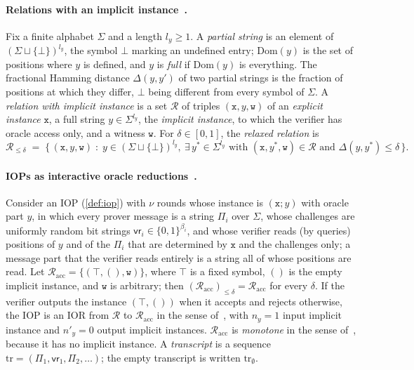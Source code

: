 \paragraph{Relations with an implicit instance~\cite[\S3.3]{CDHZ25}.}
Fix a finite alphabet $\Sigma$ and a length $l_y \ge 1$.
A \emph{partial string} is an element of $(\Sigma \sqcup \{\bot\})^{l_y}$, the symbol $\bot$ marking an undefined entry; $\mathrm{Dom}(y)$ is the set of positions where $y$ is defined, and $y$ is \emph{full} if $\mathrm{Dom}(y)$ is everything.
The fractional Hamming distance $\Delta(y,y')$ of two partial strings is the fraction of positions at which they differ, $\bot$ being different from every symbol of $\Sigma$.
A \emph{relation with implicit instance} is a set $\mathcal{R}$ of triples $(\mathtt{x}, y, \mathtt{w})$ of an \emph{explicit instance} $\mathtt{x}$, a full string $y \in \Sigma^{l_y}$, the \emph{implicit instance}, to which the verifier has oracle access only, and a witness $\mathtt{w}$.
For $\delta \in [0,1]$, the \emph{relaxed relation} is
\[
  \mathcal{R}_{\le\delta} \;=\; \bigl\{\, (\mathtt{x}, y, \mathtt{w}) \;:\; y \in (\Sigma \sqcup \{\bot\})^{l_y},\ \exists\, y^* \in \Sigma^{l_y} \text{ with } (\mathtt{x}, y^*, \mathtt{w}) \in \mathcal{R} \text{ and } \Delta(y, y^*) \le \delta \,\bigr\}.
\]

\paragraph{IOPs as interactive oracle reductions~\cite[\S3.4]{CDHZ25}.}
Consider an IOP (\cref{def:iop}) with $\nu$ rounds whose instance is $(\mathtt{x}; y)$ with oracle part $y$, in which every prover message is a string $\Pi_i$ over $\Sigma$, whose challenges are uniformly random bit strings $\mathsf{vr}_i \in \{0,1\}^{\beta_i}$, and whose verifier reads (by queries) positions of $y$ and of the $\Pi_i$ that are determined by $\mathtt{x}$ and the challenges only; a message part that the verifier reads entirely is a string all of whose positions are read.
Let $\mathcal{R}_{\mathrm{acc}} = \{(\top, (), \mathtt{w})\}$, where $\top$ is a fixed symbol, $()$ is the empty implicit instance, and $\mathtt{w}$ is arbitrary; then $(\mathcal{R}_{\mathrm{acc}})_{\le\delta} = \mathcal{R}_{\mathrm{acc}}$ for every $\delta$.
If the verifier outputs the instance $(\top, ())$ when it accepts and rejects otherwise, the IOP is an IOR from $\mathcal{R}$ to $\mathcal{R}_{\mathrm{acc}}$ in the sense of~\cite[\S3.4]{CDHZ25}, with $n_y = 1$ input implicit instance and $n'_y = 0$ output implicit instances.
$\mathcal{R}_{\mathrm{acc}}$ is \emph{monotone} in the sense of~\cite[Definition~11.1]{CDHZ25}, because it has no implicit instance.
A \emph{transcript} is a sequence $\mathrm{tr} = (\Pi_1, \mathsf{vr}_1, \Pi_2, \dots)$; the empty transcript is written $\mathrm{tr}_\emptyset$.

